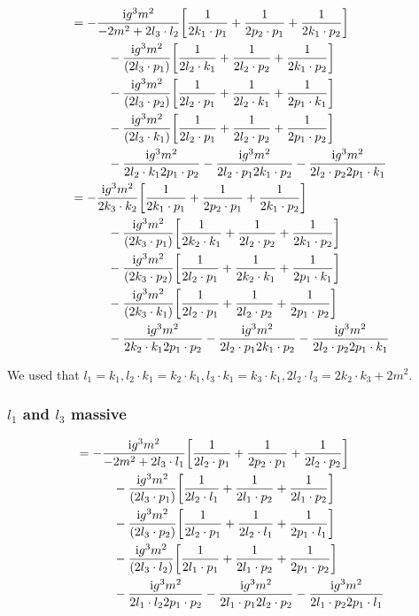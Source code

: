 \begin{align*}
    &=-\frac{\textnormal{i} g^3m^2}{-2m^2+2l_3\cdot l_2}\qty[\frac{1}{2k_1\cdot p_1}+\frac{1}{2p_2\cdot p_1}+\frac{1}{2k_1\cdot p_2}]\\
    &\quad\quad\quad-\frac{\textnormal{i} g^3m^2}{\qty(2l_3\cdot p_1)}\qty[\frac{1}{2l_2\cdot k_1}+\frac{1}{2l_2\cdot p_2}+\frac{1}{2k_1\cdot p_2}]\\
    &\quad\quad\quad-\frac{\textnormal{i} g^3m^2}{\qty(2l_3\cdot p_2)}\qty[\frac{1}{2l_2\cdot p_1}+\frac{1}{2l_2\cdot k_1}+\frac{1}{2p_1\cdot k_1}]\\
    &\quad\quad\quad-\frac{\textnormal{i} g^3m^2}{\qty(2l_3\cdot k_1)}\qty[\frac{1}{2l_2\cdot p_1}+\frac{1}{2l_2\cdot p_2}+\frac{1}{2p_1\cdot p_2}]\\
    &\quad\quad\quad-\frac{\textnormal{i} g^3m^2}{2l_2\cdot k_12p_1\cdot p_2}-\frac{\textnormal{i} g^3m^2}{2l_2\cdot p_12k_1\cdot p_2}-\frac{\textnormal{i} g^3m^2}{2l_2\cdot p_22p_1\cdot k_1}\\
    &=-\frac{\textnormal{i} g^3m^2}{2k_3\cdot k_2}\qty[\frac{1}{2k_1\cdot p_1}+\frac{1}{2p_2\cdot p_1}+\frac{1}{2k_1\cdot p_2}]\\
    &\quad\quad\quad-\frac{\textnormal{i} g^3m^2}{\qty(2k_3\cdot p_1)}\qty[\frac{1}{2k_2\cdot k_1}+\frac{1}{2l_2\cdot p_2}+\frac{1}{2k_1\cdot p_2}]\\
    &\quad\quad\quad-\frac{\textnormal{i} g^3m^2}{\qty(2k_3\cdot p_2)}\qty[\frac{1}{2l_2\cdot p_1}+\frac{1}{2k_2\cdot k_1}+\frac{1}{2p_1\cdot k_1}]\\
    &\quad\quad\quad-\frac{\textnormal{i} g^3m^2}{\qty(2k_3\cdot k_1)}\qty[\frac{1}{2l_2\cdot p_1}+\frac{1}{2l_2\cdot p_2}+\frac{1}{2p_1\cdot p_2}]\\
    &\quad\quad\quad-\frac{\textnormal{i} g^3m^2}{2k_2\cdot k_12p_1\cdot p_2}-\frac{\textnormal{i} g^3m^2}{2l_2\cdot p_12k_1\cdot p_2}-\frac{\textnormal{i} g^3m^2}{2l_2\cdot p_22p_1\cdot k_1}\\
\end{align*}

We used that $l_1=k_1, l_2\cdot k_1 = k_2\cdot k_1, l_3\cdot k_1=k_3\cdot k_1, 2l_2\cdot l_3=2k_2\cdot k_3+2m^2$.

\subsubsection{$l_1$ and $l_3$ massive}

\begin{align*}
    &=-\frac{\textnormal{i} g^3m^2}{-2m^2+2l_3\cdot l_1}\qty[\frac{1}{2l_2\cdot p_1}+\frac{1}{2p_2\cdot p_1}+\frac{1}{2l_2\cdot p_2}]\\
    &\quad\quad\quad-\frac{\textnormal{i} g^3m^2}{\qty(2l_3\cdot p_1)}\qty[\frac{1}{2l_2\cdot l_1}+\frac{1}{2l_1\cdot p_2}+\frac{1}{2l_1\cdot p_2}]\\
    &\quad\quad\quad-\frac{\textnormal{i} g^3m^2}{\qty(2l_3\cdot p_2)}\qty[\frac{1}{2l_2\cdot p_1}+\frac{1}{2l_2\cdot l_1}+\frac{1}{2p_1\cdot l_1}]\\
    &\quad\quad\quad-\frac{\textnormal{i} g^3m^2}{\qty(2l_3\cdot l_2)}\qty[\frac{1}{2l_1\cdot p_1}+\frac{1}{2l_1\cdot p_2}+\frac{1}{2p_1\cdot p_2}]\\
    &\quad\quad\quad-\frac{\textnormal{i} g^3m^2}{2l_1\cdot l_22p_1\cdot p_2}-\frac{\textnormal{i} g^3m^2}{2l_1\cdot p_12l_2\cdot p_2}-\frac{\textnormal{i} g^3m^2}{2l_1\cdot p_22p_1\cdot l_1}
\end{align*}

